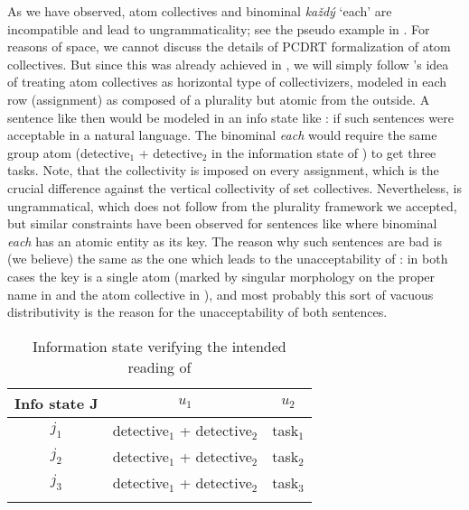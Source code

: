 \documentclass[output=paper,colorlinks,citecolor=brown,newtxmath]{langscibook}
\begin{document}
As we have observed, atom collectives and binominal \textit{každý} `each' are incompatible and lead to ungrammaticality; see the pseudo example in . For reasons of space, we cannot discuss the details of PCDRT formalization of atom collectives. But since this was already achieved in \citet{Dotlacil2013}, we will simply follow \citeauthor{Dotlacil2013}'s idea of treating atom collectives as horizontal type of collectivizers, modeled in each row (assignment) as composed of a plurality but atomic from the outside. A sentence like  then would be modeled in an info state like : if such sentences were acceptable in a natural language. The binominal \textit{each} would require the same group atom (detective$_1$ + detective$_2$ in the information state of ) to get three tasks. Note, that the collectivity is imposed on every assignment, which is the crucial difference against the vertical collectivity of set collectives. Nevertheless,  is ungrammatical, which does not follow from the plurality framework we accepted, but similar constraints have been observed for sentences like  where binominal \textit{each} has an atomic entity as its key.
The reason why such sentences are bad is (we believe) the same as the one which leads to the unacceptability of : in both cases the key is a single atom (marked by singular morphology on the proper name in  and the atom collective in ), and most probably this sort of vacuous distributivity is the reason for the unacceptability of both sentences.

\label{ex:sec-bin-each-atom-coll}
\z

\begin{table}
\centering
\begin{tabularx}{0.6\textwidth}{ccc}
\lsptoprule
Info state J & \(u_1\) & \(u_2\)\tabularnewline
\midrule
\(j_1\) & detective\(_1\) + detective\(_2\) & task\(_1\)\tabularnewline
\(j_2\) & detective\(_1\) + detective\(_2\) & task\(_2\)\tabularnewline
\(j_3\) & detective\(_1\) + detective\(_2\) & task\(_3\)\tabularnewline
\lspbottomrule
\end{tabularx}
\caption{Information state verifying the intended reading of }
\label{table6}
\end{table}
\end{document}
